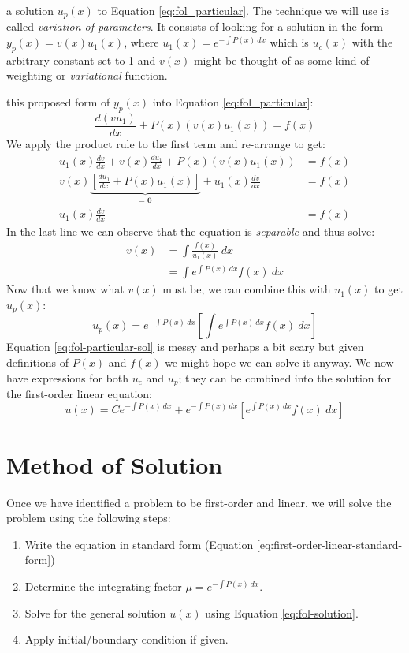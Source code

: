  a solution $u_p(x)$ to Equation \ref{eq:fol_particular}.  The technique we will use is called \emph{variation of parameters}.  It consists of looking for a solution in the form $y_p(x) = v(x)u_1(x)$, where $u_1(x) = e^{-\int P(x) \ dx}$ which is $u_c(x)$ with the arbitrary constant set to 1 and $v(x)$ might be thought of as some kind of weighting or \emph{variational} function.

 this proposed form of $y_p(x)$ into Equation \ref{eq:fol_particular}:
\begin{equation*}
\frac{d(vu_1)}{dx} + P(x)(v(x)u_1(x))=f(x)
\end{equation*}
We apply the product rule to the first term and re-arrange to get:
\begin{align*}
u_1(x)\frac{dv}{dx}+ v(x)\frac{du_1}{dx} + P(x)(v(x)u_1(x)) &= f(x) \\
v(x)\underbrace{\left[\frac{du_1}{dx}+P(x)u_1(x) \right]}_{\textbf{= 0}}+u_1(x)\frac{dv}{dx} &= f(x) \\
u_1(x)\frac{dv}{dx} &= f(x)
\end{align*}
In the last line we can observe that the equation is \emph{separable} and thus solve:
\begin{align*}
v(x) &= \int \frac{f(x)}{u_1(x)} \ dx \\
     &= \int e^{\int P(x) \ dx}f(x) \ dx
\end{align*}
Now that we know what $v(x)$ must be, we can combine this with $u_1(x)$ to get $u_p(x)$:
\begin{equation}
u_p(x) = e^{-\int P(x) \ dx}\left[\int e^{\int P(x) \ dx}f(x) \ dx \right]
\label{eq:fol-particular-sol}
\end{equation}
Equation \ref{eq:fol-particular-sol} is messy and perhaps a bit scary but given definitions of $P(x)$ and $f(x)$ we might hope we can solve it anyway.  We now have expressions for both $u_c$ and $u_p$; they can be combined into the solution for the first-order linear equation:
\begin{equation}
u(x) = Ce^{-\int P(x) \ dx} + e^{-\int P(x) \ dx} \left[e^{\int P(x) \ dx} f(x) \ dx \right]
\label{eq:fol-solution}
\end{equation}

\section{Method of Solution}
Once we have identified a problem to be first-order and linear, we will solve the problem using the following steps:
\begin{enumerate}
\item Write the equation in standard form (Equation \ref{eq:first-order-linear-standard-form})
\item Determine the integrating factor $\mu = e^{-\int P(x) \ dx}$.
\item Solve for the general solution $u(x)$ using Equation \ref{eq:fol-solution}.
\item Apply initial/boundary condition if given.
\end{enumerate}

